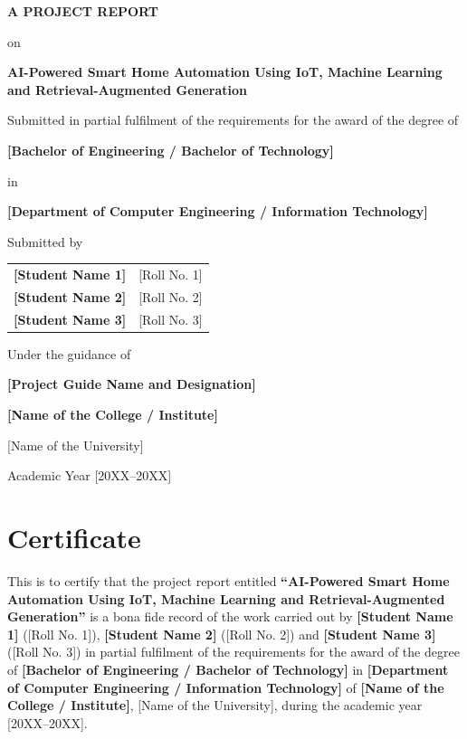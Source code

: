 \documentclass[12pt,a4paper,oneside]{report}
\newcommand{\ProjectTitle}{AI-Powered Smart Home Automation Using IoT, Machine Learning and Retrieval-Augmented Generation}
\newcommand{\StudentOne}{[Student Name 1]}
\newcommand{\RollOne}{[Roll No. 1]}
\newcommand{\StudentTwo}{[Student Name 2]}
\newcommand{\RollTwo}{[Roll No. 2]}
\newcommand{\StudentThree}{[Student Name 3]}
\newcommand{\RollThree}{[Roll No. 3]}
\newcommand{\GuideName}{[Project Guide Name and Designation]}
\newcommand{\Department}{[Department of Computer Engineering / Information Technology]}
\newcommand{\College}{[Name of the College / Institute]}
\newcommand{\University}{[Name of the University]}
\newcommand{\Degree}{[Bachelor of Engineering / Bachelor of Technology]}
\newcommand{\AcademicYear}{[20XX--20XX]}
\begin{document}

\begin{titlepage}
\centering
{}
{\large\bfseries A PROJECT REPORT\par}
\vspace{0.3cm}
{\normalsize on\par}
\vspace{0.6cm}
{\LARGE\bfseries \ProjectTitle\par}
\vspace{0.9cm}
{\normalsize Submitted in partial fulfilment of the requirements for the award of the degree of\par}
\vspace{0.3cm}
{\large\bfseries \Degree\par}
\vspace{0.2cm}
{\normalsize in\par}
{\large\bfseries \Department\par}
\vspace{0.9cm}
{\normalsize Submitted by\par}
\vspace{0.3cm}
\begin{tabular}{lc}
\textbf{\StudentOne} & \RollOne\\
\textbf{\StudentTwo} & \RollTwo\\
\textbf{\StudentThree} & \RollThree
\end{tabular}
\vspace{0.9cm}

{\normalsize Under the guidance of\par}
{\large\bfseries \GuideName\par}
\vspace{1.2cm}
{\large\bfseries \College\par}
{\normalsize \University\par}
\vspace{0.4cm}
{\normalsize Academic Year \AcademicYear\par}
\end{titlepage}

\chapter*{Certificate}
This is to certify that the project report entitled
\textbf{``\ProjectTitle''} is a bona fide record of the work carried out by
\textbf{\StudentOne} (\RollOne), \textbf{\StudentTwo} (\RollTwo) and \textbf{\StudentThree} (\RollThree)
in partial fulfilment of the requirements for the award of the degree of \textbf{\Degree} in
\textbf{\Department} of \textbf{\College}, \University, during the academic year \AcademicYear.
\end{document}
